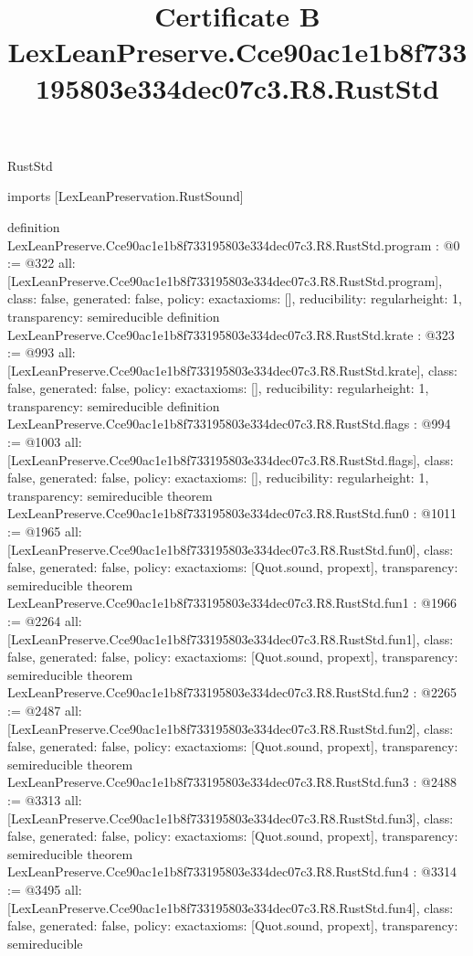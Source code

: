 \begin{lexlean}{RustStd}
\title{Certificate B LexLeanPreserve.Cce90ac1e1b8f733195803e334dec07c3.R8.RustStd}
\begin{coremodule}
imports [LexLeanPreservation.RustSound]

definition LexLeanPreserve.Cce90ac1e1b8f733195803e334dec07c3.R8.RustStd.program : @0 := @322 {
  all: [LexLeanPreserve.Cce90ac1e1b8f733195803e334dec07c3.R8.RustStd.program],
  class: false,
  generated: false,
  policy: exact{axioms: []},
  reducibility: regular{height: 1},
  transparency: semireducible
}
definition LexLeanPreserve.Cce90ac1e1b8f733195803e334dec07c3.R8.RustStd.krate : @323 := @993 {
  all: [LexLeanPreserve.Cce90ac1e1b8f733195803e334dec07c3.R8.RustStd.krate],
  class: false,
  generated: false,
  policy: exact{axioms: []},
  reducibility: regular{height: 1},
  transparency: semireducible
}
definition LexLeanPreserve.Cce90ac1e1b8f733195803e334dec07c3.R8.RustStd.flags : @994 := @1003 {
  all: [LexLeanPreserve.Cce90ac1e1b8f733195803e334dec07c3.R8.RustStd.flags],
  class: false,
  generated: false,
  policy: exact{axioms: []},
  reducibility: regular{height: 1},
  transparency: semireducible
}
theorem LexLeanPreserve.Cce90ac1e1b8f733195803e334dec07c3.R8.RustStd.fun0 : @1011 := @1965 {
  all: [LexLeanPreserve.Cce90ac1e1b8f733195803e334dec07c3.R8.RustStd.fun0],
  class: false,
  generated: false,
  policy: exact{axioms: [Quot.sound, propext]},
  transparency: semireducible
}
theorem LexLeanPreserve.Cce90ac1e1b8f733195803e334dec07c3.R8.RustStd.fun1 : @1966 := @2264 {
  all: [LexLeanPreserve.Cce90ac1e1b8f733195803e334dec07c3.R8.RustStd.fun1],
  class: false,
  generated: false,
  policy: exact{axioms: [Quot.sound, propext]},
  transparency: semireducible
}
theorem LexLeanPreserve.Cce90ac1e1b8f733195803e334dec07c3.R8.RustStd.fun2 : @2265 := @2487 {
  all: [LexLeanPreserve.Cce90ac1e1b8f733195803e334dec07c3.R8.RustStd.fun2],
  class: false,
  generated: false,
  policy: exact{axioms: [Quot.sound, propext]},
  transparency: semireducible
}
theorem LexLeanPreserve.Cce90ac1e1b8f733195803e334dec07c3.R8.RustStd.fun3 : @2488 := @3313 {
  all: [LexLeanPreserve.Cce90ac1e1b8f733195803e334dec07c3.R8.RustStd.fun3],
  class: false,
  generated: false,
  policy: exact{axioms: [Quot.sound, propext]},
  transparency: semireducible
}
theorem LexLeanPreserve.Cce90ac1e1b8f733195803e334dec07c3.R8.RustStd.fun4 : @3314 := @3495 {
  all: [LexLeanPreserve.Cce90ac1e1b8f733195803e334dec07c3.R8.RustStd.fun4],
  class: false,
  generated: false,
  policy: exact{axioms: [Quot.sound, propext]},
  transparency: semireducible
}
\end{coremodule}
\end{lexlean}
